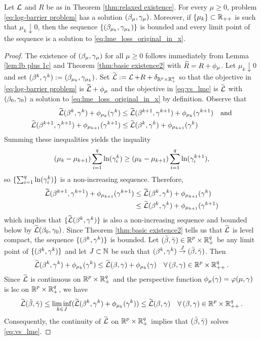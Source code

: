 \begin{theorem}
\label{thm:mu consistency}
Let $\LL$ and $R$ be as in Theorem \ref{thm:relaxed existence}. 
For every $\mu\ge 0$, problem 
\eqref{eq:log-barrier problem} has a solution $(\beta_\mu,\gam_\mu)$.
Moreover, if $\{\mu_k\}\subset\R_{++}$ is such that $\mu_k\downarrow 0$,
then the sequence $\{(\beta_{\mu_k},\gam_{\mu_k})\}$ is bounded
and every limit point of the sequence %
is a 
solution to \eqref{eq:lme_loss_original_in_x}.
\end{theorem}
\begin{proof}
The existence of $(\beta_\mu,\gam_\mu)$ for all $\mu\ge 0$ 
follows immediately from 
Lemma \ref{lem:lb plus 1c} and Theorem \ref{thm:basic existence2} with
$\hR=R+\phimu$. 
Let $\mu_k\downarrow 0$
and set $(\beta^k,\gam^k):=(\beta_{\mu_k},\gam_{\mu_k})$.
Set $\tLL:=\LL+R+\del_{\Rp\times\Rqp}$ so that 
the objective in \eqref{eq:log-barrier problem} is $\tLL+\phimu$
and the objective in \eqref{eq:vs_lme} is $\tLL$
with $(\beta_0,\gam_0)$ a solution to \eqref{eq:lme_loss_original_in_x}
by definition. 
Observe that
\[\begin{aligned}
\tLL\bgk+\phi_{\mu_k}(\gam^k)&\le 
\tLL(\beta^{k+1},\gam^{k+1})+\phi_{\mu_k}(\gam^{k+1})\quad \text{and}
\\
\tLL(\beta^{k+1},\gam^{k+1})+\phi_{\mu_{k+1}}(\gam^{k+1})&\le 
\tLL(\beta^{k},\gam^{k})+\phi_{\mu_{k+1}}(\gam^k)
\end{aligned}\]
Summing these inequalities yields the inquality
\[
(\mu_k-\mu_{k+1})\sum_{i=1}^q\ln(\gam^{k}_i)
\ge 
(\mu_k-\mu_{k+1})\sum_{i=1}^q\ln(\gam^{k+1}_i),
\]
so $\{\sum_{i=1}^q\ln(\gam^{k}_i)\}$ is a non-increasing sequence.
Therefore,
\[\begin{aligned}
\tLL(\beta^{k+1},\gam^{k+1})+\phi_{\mu_{k+1}}(\gam^{k+1})&\le 
\tLL(\beta^{k},\gam^{k})+\phi_{\mu_{k+1}}(\gam^k)
\\ &\le
\tLL(\beta^{k},\gam^{k})+\phi_{\mu_{k+1}}(\gam^{k+1})
\end{aligned}\]
which implies that $\{\tLL(\beta^{k},\gam^{k})\}$
is also a non-increasing sequence and bounded below by 
$\tLL(\beta_0,\gam_0)$. 
Since
Theorem \ref{thm:basic existence2} tells us that $\tLL$ is level compact,
the sequence $\{\bgk\}$ is bounded. 
Let $(\bbeta,\bgam)\in\Rp\times\Rqp$ be any
limit point of $\{\bgk\}$ and let $J\subset\N$ be such that
$\bgk\overset{J}{\rightarrow}(\bbeta,\bgam)$. Then
\[
\tLL\bgk+\phi_{\mu_k}(\gam^k)\le
\tLL\bg+\phi_{\mu_k}(\gam) \quad \forall\,\bg\in\Rp\times\R^q_{++}.
\]
Since $\tLL$ is continuous on $\Rp\times\Rqp$ and the perspective function
$\phi_{\mu}(\gam)=\varphi(\mu,\gam)$ is lsc on $\Rp\times\Rqp$, we have
\[
\tLL(\bbeta,\bgam)\le\liminf_{k\in J}(\tLL\bgk+\phi_{\mu_k}(\gam^k))\le
\tLL\bg \quad \forall\,\bg\in\Rp\times\R^q_{++}.
\]
Consequently, the continuity of $\tLL$ on $\Rp\times\Rqp$ implies
that $(\bbeta,\bgam)$ solves \eqref{eq:vs_lme}.
\end{proof}


